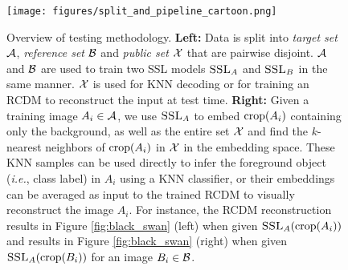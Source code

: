 \begin{figure}[t]
     \texttt{[image: figures/split\_and\_pipeline\_cartoon.png]}
\caption[Overview of testing methodology.]{
Overview of testing methodology. \textbf{Left:} Data is split into \emph{target set} $\mathcal{A}$, \emph{reference set} $\mathcal{B}$ and \emph{public set} $\mathcal{X}$ that are pairwise disjoint. $\mathcal{A}$ and $\mathcal{B}$ are used to train two SSL models $\textsc{SSL}_A$ and $\textsc{SSL}_B$ in the same manner. $\mathcal{X}$ is used for KNN decoding or for training an RCDM to reconstruct the input at test time. \textbf{Right:} Given a training image $A_i \in \mathcal{A}$, we use $\textsc{SSL}_A$ to embed $\mathrm{crop}({A_i})$ containing only the background, as well as the entire set $\mathcal{X}$ and find the $k$-nearest neighbors of $\mathrm{crop}({A_i})$ in $\mathcal{X}$ in the embedding space. These KNN samples can be used directly to infer the foreground object (\emph{i.e.}, class label) in $A_i$ using a KNN classifier, or their embeddings can be averaged as input to the trained RCDM to visually reconstruct the image $A_i$. For instance, the RCDM reconstruction results in Figure \ref{fig:black_swan} (left) when given $\textsc{SSL}_A(\mathrm{crop}({A_i}))$ and results in Figure \ref{fig:black_swan} (right) when given $\textsc{SSL}_A(\mathrm{crop}({B_i}))$ for an image $B_i \in \mathcal{B}$.
}
\end{figure}
